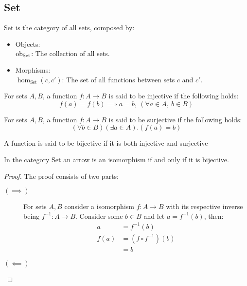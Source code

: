 \subsection{Set}
\begin{definition}[Set]
  Set is the category of all sets, composed by:
  \parencite{awodey:category_theory}
  \begin{itemize}
    \item Objects:\\
      $\mathrm{ob}_{\mathrm{Set}}$: The collection of all sets.
    \item Morphisms:\\
      $\hom_{\mathrm{Set}}(c, c')$: The set of all functions between sets $c$ and
      $c'$.
  \end{itemize}
\end{definition}

\begin{definition}
  For sets $A,B$, a function $f:A\to B$ is said to be injective if the following
  holds:
  \[f(a)=f(b) \implies a=b,\ (\forall a\in A,\ b\in B)\]
\end{definition}

\begin{definition}
  For sets $A,B$, a function $f:A\to B$ is said to be surjective if the
  following holds:
  \[(\forall b\in B)(\exists a\in A).(f(a)=b)\]
\end{definition}

\begin{definition}
  A function is said to be bijective if it is both injective and surjective
\end{definition}

\begin{theorem}

\end{theorem}

\begin{theorem}
  In the category Set an arrow is an isomorphism if and only if it is
  bijective.

  \begin{proof}
    The proof consists of two parts:
    \begin{description}
      \item[$(\implies)$] For sets $A,B$ consider a isomorphism $f:A\to B$ with
        its respective inverse being $f^{-1}: A\to B$. Consider some $b\in B$
        and let $a = f^{-1}(b)$, then:
        \[
          \begin{aligned}
            a &= f^{-1}(b)\\
            f(a) &= (f\circ f^{-1})(b)\\
            &= b
          \end{aligned}
        \]
      \item[$(\impliedby)$]
    \end{description}
  \end{proof}
\end{theorem}